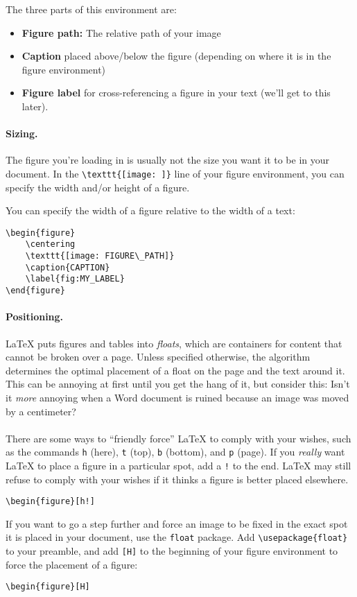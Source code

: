 \documentclass[11pt]{article}
\begin{document}
\noindent The three parts of this environment are:

\begin{itemize}[noitemsep,nolistsep]
    \item \textbf{Figure path:} The relative path of your image
    \item \textbf{Caption} placed above/below the figure (depending on where it is in the figure environment)
    \item \textbf{Figure label} for cross-referencing a figure in your text (we'll get to this later).
\end{itemize}

\paragraph{Sizing.} The figure you're loading in is usually not the size you want it to be in your document. In the \verb|\texttt{[image: ]}| line of your figure environment, you can specify the width and/or height of a figure.

\noindent You can specify the width of a figure relative to the width of a text:
\begin{lstlisting}
\begin{figure}
    \centering
    \texttt{[image: FIGURE\_PATH]}
    \caption{CAPTION}
    \label{fig:MY_LABEL}
\end{figure}

\end{lstlisting}

\paragraph{Positioning.} {\LaTeX} puts figures and tables into \textit{floats}, which are containers for content that cannot be broken over a page. Unless specified otherwise, the algorithm determines the optimal placement of a float on the page and the text around it. This can be annoying at first until you get the hang of it, but consider this: Isn't it \textit{more} annoying when a Word document is ruined because an image was moved by a centimeter? \\~\\
\noindent There are some ways to ``friendly force'' {\LaTeX} to comply with your wishes, such as the commands \texttt{h} (here),  \texttt{t} (top),  \texttt{b} (bottom), and  \texttt{p} (page). If you \textit{really} want {\LaTeX} to place a figure in a particular spot, add a \texttt{!} to the end. {\LaTeX} may still refuse to comply with your wishes if it thinks a figure is better placed elsewhere.
\begin{lstlisting}
\begin{figure}[h!]
\end{lstlisting}
\noindent If you want to go a step further and force an image to be fixed in the exact spot it is placed in your document, use the \verb|float| package. Add \verb|\usepackage{float}| to your preamble, and add \verb|[H]| to the beginning of your figure environment to force the placement of a figure:
\begin{lstlisting}
\begin{figure}[H]
\end{lstlisting}
\end{document}
